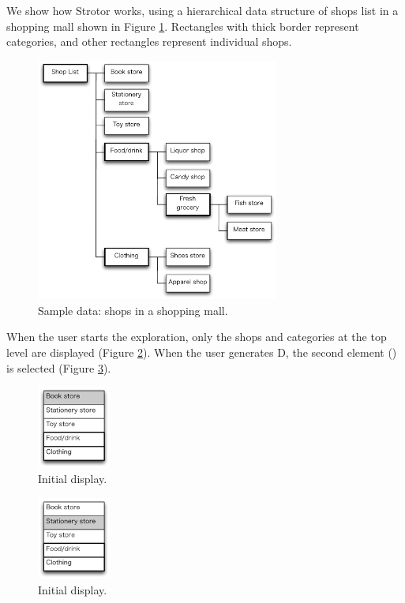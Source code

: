 \documentclass{article}
\begin{document}
We show how Strotor works, using a hierarchical data structure of
shops list in a shopping mall shown in Figure \ref{fig1}.
Rectangles with thick border represent categories, and
other rectangles represent individual shops.

\begin{figure}[H]
\centerline{\includegraphics[width=80mm,bb=0 0 490 490]{figures/fig1.pdf}}
\caption{Sample data: shops in a shopping mall.}
\label{fig1}
\end{figure}

When the user starts the exploration, only the shops and categories
at the top level are displayed (Figure \ref{fig2}).
When the user generates D,
the second element () is selected (Figure \ref{fig3}).

\begin{figure}[H]
\centerline{\includegraphics[width=24mm,bb=0 0 139 157]{figures/fig2.pdf}}
\caption{Initial display.}
\label{fig2}
\end{figure}

\begin{figure}[H]
\centerline{\includegraphics[width=24mm,bb=0 0 139 157]{figures/fig3.pdf}}
\caption{Initial display.}
\label{fig3}
\end{figure}
\end{document}
